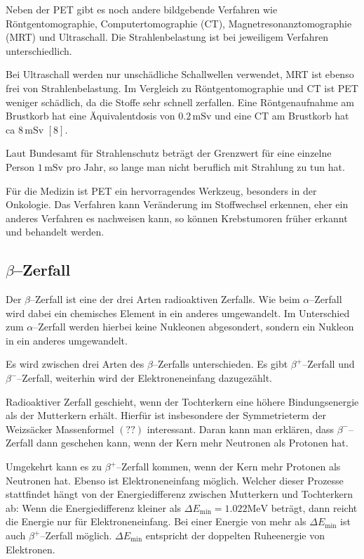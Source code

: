 \documentclass[12pt,a4paper]{scrartcl}
\numberwithin{equation}{section} %
\newcommand{\pu}[1]{\ensuremath{\mathrm{#1}}}
\renewcommand{\[}{} %
\renewcommand{\]}{\noindent} %
\begin{document}
Neben der PET gibt es noch andere bildgebende Verfahren wie
Röntgentomographie, Computertomographie (CT), Magnetresonanztomographie
(MRT) und Ultraschall. Die Strahlenbelastung ist bei jeweiligem
Verfahren unterschiedlich.

Bei Ultraschall werden nur unschädliche Schallwellen verwendet, MRT ist
ebenso frei von Strahlenbelastung. Im Vergleich zu Röntgentomographie
und CT ist PET weniger schädlich, da die Stoffe sehr schnell zerfallen.
Eine Röntgenaufnahme am Brustkorb hat eine Äquivalentdosis von
\(\pu{0.2 \,mSv}\) und eine CT am Brustkorb hat ca \(\pu{8 \,mSv}\) \([8]\).

Laut Bundesamt für Strahlenschutz beträgt der Grenzwert für eine
einzelne Person \(\pu{1 \,mSv}\) pro Jahr, so lange man nicht beruflich
mit Strahlung zu tun hat.

Für die Medizin ist PET ein hervorragendes Werkzeug, besonders in der
Onkologie. Das Verfahren kann Veränderung im Stoffwechsel erkennen, eher
ein anderes Verfahren es nachweisen kann, so können Krebstumoren früher
erkannt und behandelt werden.

\hypertarget{betazerfall}{%
\subsection{\texorpdfstring{\(\beta\)--Zerfall}{\textbackslash beta--Zerfall}}\label{betazerfall}}

Der \(\beta\)--Zerfall ist eine der drei Arten radioaktiven Zerfalls.
Wie beim \(\alpha\)--Zerfall wird dabei ein chemisches Element in ein
anderes umgewandelt. Im Unterschied zum \(\alpha\)--Zerfall werden
hierbei keine Nukleonen abgesondert, sondern ein Nukleon in ein anderes
umgewandelt.

Es wird zwischen drei Arten des \(\beta\)--Zerfalls unterschieden. Es
gibt \(\beta^+\)--Zerfall und \(\beta^-\)--Zerfall, weiterhin wird der
Elektroneneinfang dazugezählt.

Radioaktiver Zerfall geschieht, wenn der Tochterkern eine höhere
Bindungsenergie als der Mutterkern erhält. Hierfür ist insbesondere der
Symmetrieterm der Weizsäcker Massenformel \((??)\) interessant. Daran
kann man erklären, dass \(\beta^-\)--Zerfall dann geschehen kann, wenn
der Kern mehr Neutronen als Protonen hat.

Umgekehrt kann es zu \(\beta^+\)--Zerfall kommen, wenn der Kern mehr
Protonen als Neutronen hat. Ebenso ist Elektroneneinfang möglich.
Welcher dieser Prozesse stattfindet hängt von der Energiedifferenz
zwischen Mutterkern und Tochterkern ab: Wenn die Energiedifferenz
kleiner als \(\Delta E_\mathrm{min}=\pu{1.022 MeV}\) beträgt, dann
reicht die Energie nur für Elektroneneinfang. Bei einer Energie von mehr
als \(\Delta E_\mathrm{min}\) ist auch \(\beta^+\)--Zerfall möglich.
\(\Delta E_\mathrm{min}\) entspricht der doppelten Ruheenergie von
Elektronen.
\end{document}
